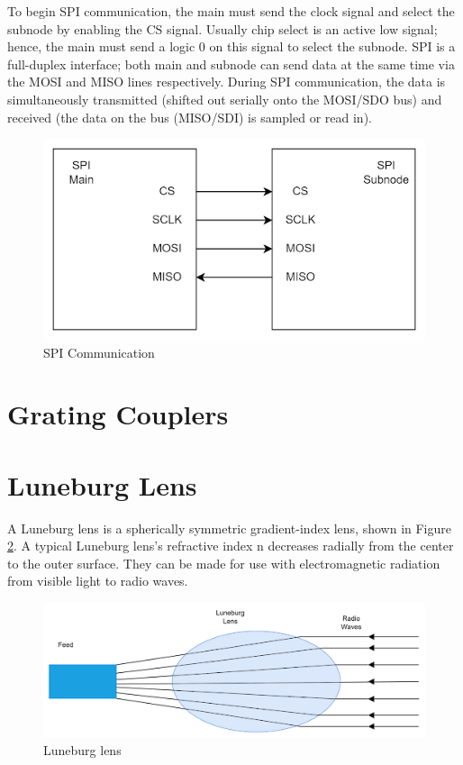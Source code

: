 \documentclass[a4paper,12pt]{report}
\begin{document}
To begin SPI communication,
the main must send the clock signal and select the subnode
by enabling the CS signal.
Usually chip select is an active low signal; hence,
the main must send a logic 0 on this signal to select the subnode.
SPI is a full-duplex interface;
both main and subnode can send data at the same time
via the MOSI and MISO lines respectively.
During SPI communication,
the data is simultaneously transmitted
(shifted out serially onto the MOSI/SDO bus)
and received (the data on the bus (MISO/SDI) is sampled or read in).

\begin{figure}
  \begin{center}
    \includegraphics[clip, keepaspectratio, width=0.5\linewidth]{img/SPI_communication.png}
    \caption{SPI Communication}
    \label{fig:SPI_Communication}
  \end{center}
\end{figure}

\section{Grating Couplers}

\section{Luneburg Lens}


A Luneburg lens is a spherically symmetric gradient-index lens,
shown in Figure \ref{fig:luneburg_lens}.
A typical Luneburg lens's refractive index n decreases radially
from the center to the outer surface.
They can be made for use with electromagnetic radiation
from visible light to radio waves.

\begin{figure}
  \begin{center}
    \includegraphics[clip, keepaspectratio, width=0.5\linewidth]{img/luneburg_lens.png}
    \caption{Luneburg lens}
    \label{fig:luneburg_lens}
  \end{center}
\end{figure}
\end{document}
